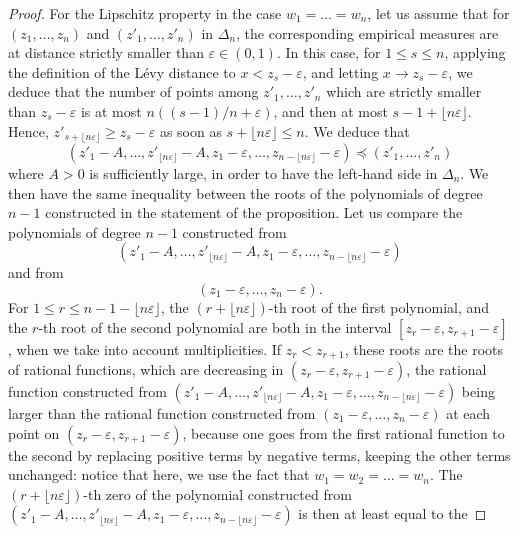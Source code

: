 \documentclass[10pt,a4paper]{amsart}
\begin{document}
\begin{proof}
For the Lipschitz property in the case 
$w_1 = \dots = w_n$, let us assume that 
for $(z_1, \dots, z_n)$ and 
$(z'_1, \dots, z'_n)$ in $\Delta_n$, the corresponding empirical measures are at distance strictly smaller than $\varepsilon \in (0,1)$. 
In this case, for $1 \leq s \leq n$, applying the definition
of the L\'evy distance to $x < z_s - \varepsilon$,  and letting $x \rightarrow z_s - \varepsilon$, we deduce that the number of points 
among $z'_1, \dots, z'_n$ which are strictly smaller than 
$z_s - \varepsilon$ is at most $n ( (s-1)/n + \varepsilon)$, and then at most $s - 1 + \lfloor n \varepsilon \rfloor $. Hence, 
$z'_{s + \lfloor n \varepsilon \rfloor}  \geq z_s - \varepsilon$ as soon 
as $s + \lfloor n \varepsilon \rfloor \leq n$. 
We deduce that
$$(z'_1 - A, \dots, z'_{ \lfloor n \varepsilon \rfloor} - A, z_1 - \varepsilon, \dots, z_{n -\lfloor n \varepsilon \rfloor} - \varepsilon)
\preccurlyeq (z'_1, \dots, z'_n) $$
where $A > 0$ is sufficiently large, in order to have the left-hand side in $\Delta_n$. 
We then have the same inequality 
between the roots of the polynomials of degree $n-1$
constructed in the statement of the proposition. 
Let us compare the polynomials of degree $n-1$
constructed from 
$$(z'_1 - A, \dots, z'_{ \lfloor n \varepsilon \rfloor} - A, z_1 - \varepsilon, \dots, z_{n -\lfloor n \varepsilon \rfloor} - \varepsilon)$$ and from 
$$ (z_1 - \varepsilon, \dots, z_n - \varepsilon).$$
For $1 \leq r \leq n - 1- \lfloor n \varepsilon \rfloor$, 
the $(r + \lfloor n \varepsilon \rfloor)$-th 
root of the first polynomial, and the $r$-th root of the second polynomial are both in the interval $[z_r - \varepsilon, z_{r+1} - \varepsilon]$, when we take into account multiplicities. If $z_r < z_{r+1}$, these roots are the roots of rational functions, which are decreasing in $(z_r- \varepsilon, z_{r+1}- \varepsilon)$, 
the rational function constructed from 
$(z'_1 - A, \dots, z'_{ \lfloor n \varepsilon \rfloor} - A, z_1 - \varepsilon, \dots, z_{n -\lfloor n \varepsilon \rfloor} - \varepsilon)$ being larger than the rational function constructed from $(z_1 - \varepsilon, \dots, z_n - \varepsilon)$ at each point on $(z_r- \varepsilon, z_{r+1}- \varepsilon)$, because one goes from the first rational function to the second by replacing positive terms by negative terms, keeping the other terms unchanged: notice that here, we use the fact that $w_1 = w_2 = \dots = w_n$.  The $(r + \lfloor n \varepsilon \rfloor)$-th zero of the polynomial constructed 
from $(z'_1 - A, \dots, z'_{ \lfloor n \varepsilon \rfloor} - A, z_1 - \varepsilon, \dots, z_{n -\lfloor n \varepsilon \rfloor} - \varepsilon)$ is then at least equal to the 

\end{proof}
\end{document}
